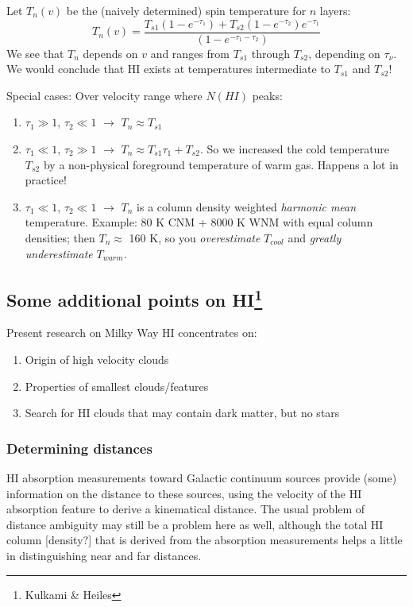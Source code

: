 \documentclass[11pt]{article}
\newcommand{\mar}[1]{\hspace{0pt}\marginpar{-\textcolor{black}{#1}-}}
\begin{document}
\begin{enumerate}[itemsep=1ex]
        \mar{48}Let $T_{n}(v)$ be the (naively determined) spin
        temperature for $n$ layers:
        \[
            T_{n}(v) = \frac
                { T_{s1} ( 1 - e^{-\tau_{1}}) + T_{s2} ( 1 - e^{-\tau_{2}})e^{-\tau_{1}} }
                { (1 - e^{-\tau_{1}-\tau_{2}}) }
            \]
        We see that $T_{n}$ depends on $v$ and ranges from $T_{s1}$ through
        $T_{s2}$, depending on $\tau_{\nu}$. We would conclude that HI exists at
        temperatures intermediate to $T_{s1}$ and $T_{s2}$!
\end{enumerate}

Special cases:
Over velocity range where $N(HI)$ peaks:
\begin{enumerate}
    \item $\tau_{1} \gg 1$, $\tau_{2} \ll 1$ $\longrightarrow$
        $T_{n} \approx T_{s1}$
    \item $\tau_{1} \ll 1$, $\tau_{2} \gg 1$ $\longrightarrow$
        $T_{n} \approx T_{s1}\tau_{1} + T_{s2}$.
        So we increased the cold temperature $T_{s2}$ by a non-physical
        foreground temperature of warm gas. Happens a lot in practice!
    \item $\tau_{1} \ll 1$, $\tau_{2} \ll 1$ $\longrightarrow$
        $T_{n}$ is a column density weighted \emph{harmonic mean} temperature.
        Example: 80 K CNM + 8000 K WNM with equal column densities; then $T_{n}
        \approx$ 160 K, so you \emph{overestimate} $T_{cool}$ and \emph{greatly
        underestimate} $T_{warm}$.
\end{enumerate}

\subsection{Some additional points on HI\footnote{Kulkami \& Heiles}}
Present research on Milky Way HI concentrates on:
\begin{enumerate}
    \item Origin of high velocity clouds
    \item Properties of smallest clouds/features
    \item Search for HI clouds that may contain dark matter, but no stars
\end{enumerate}

\subsubsection{Determining distances}
\mar{49}HI absorption measurements toward Galactic continuum sources provide
(some) information on the distance to these sources, using the velocity of the
HI absorption feature to derive a kinematical distance. The usual problem of
distance ambiguity may still be a problem here as well, although the total HI
column [density?] that is derived from the absorption measurements helps a
little in distinguishing near and far distances.
\end{document}
